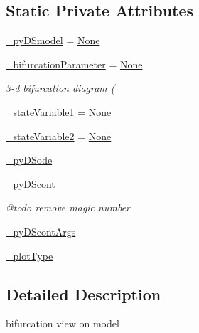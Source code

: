 \subsection*{Static Private Attributes}
\begin{DoxyCompactItemize}
\item 
\hyperlink{class_mu_mo_t_1_1_mu_mo_tbifurcation_view_a9e9a430da6d323cc4411c070e0c7eee5}{\+\_\+py\+D\+Smodel} = \hyperlink{class_mu_mo_t_1_1_mu_mo_tbifurcation_view_ac7485dcc8d256a6f197ed7802687f252}{None}
\item 
\hyperlink{class_mu_mo_t_1_1_mu_mo_tbifurcation_view_a17d5bd0e623faea6f50fc3b7f01d0d38}{\+\_\+bifurcation\+Parameter} = \hyperlink{class_mu_mo_t_1_1_mu_mo_tbifurcation_view_ac7485dcc8d256a6f197ed7802687f252}{None}
\begin{DoxyCompactList}\small\item\em 3-\/d bifurcation diagram ( \end{DoxyCompactList}\item 
\hyperlink{class_mu_mo_t_1_1_mu_mo_tbifurcation_view_aa14fa36730691becc6f3136899545416}{\+\_\+state\+Variable1} = \hyperlink{class_mu_mo_t_1_1_mu_mo_tbifurcation_view_ac7485dcc8d256a6f197ed7802687f252}{None}
\item 
\hyperlink{class_mu_mo_t_1_1_mu_mo_tbifurcation_view_a9d3705d1d9182e10751ff693573d6d16}{\+\_\+state\+Variable2} = \hyperlink{class_mu_mo_t_1_1_mu_mo_tbifurcation_view_ac7485dcc8d256a6f197ed7802687f252}{None}
\item 
\hyperlink{class_mu_mo_t_1_1_mu_mo_tbifurcation_view_a45f0a60363e440604d8e5b08930eb7b5}{\+\_\+py\+D\+Sode}
\item 
\hyperlink{class_mu_mo_t_1_1_mu_mo_tbifurcation_view_a797e92fe19ce2636a49bf1400a69fc49}{\+\_\+py\+D\+Scont}
\begin{DoxyCompactList}\small\item\em @todo remove magic number \end{DoxyCompactList}\item 
\hyperlink{class_mu_mo_t_1_1_mu_mo_tbifurcation_view_aa56e2cffc879be68fdec55f29334415c}{\+\_\+py\+D\+Scont\+Args}
\item 
\hyperlink{class_mu_mo_t_1_1_mu_mo_tbifurcation_view_a5feff4ca83ee97d6e09874496a4975d4}{\+\_\+plot\+Type}
\end{DoxyCompactItemize}


\subsection{Detailed Description}
bifurcation view on model 

